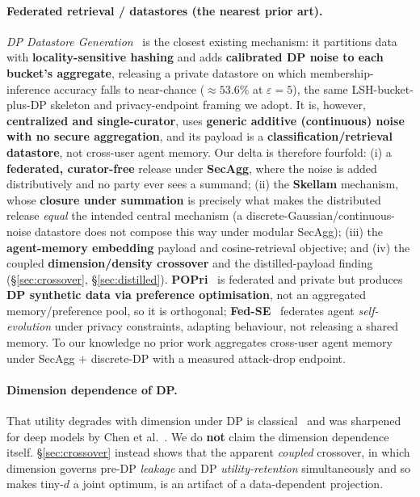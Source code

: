 \documentclass[pdflatex,sn-mathphys-num,12pt]{sn-jnl}
\theoremstyle{thmstyleone}%
\theoremstyle{thmstyletwo}%
\theoremstyle{thmstylethree}%
\newcommand{\eps}{\varepsilon}
\newcommand{\secref}[1]{\S\ref{#1}}
\begin{document}
\paragraph{Federated retrieval / datastores (the nearest prior art).}
\emph{DP Datastore Generation}~\cite{abouelenein2026dpdatastore} is the closest
existing mechanism: it partitions data with \textbf{locality-sensitive hashing}
and adds \textbf{calibrated DP noise to each bucket's aggregate}, releasing a
private datastore on which membership-inference accuracy falls to near-chance
($\approx 53.6\%$ at $\eps = 5$), the same LSH-bucket-plus-DP skeleton and
privacy-endpoint framing we adopt. It is, however, \textbf{centralized and
single-curator}, uses \textbf{generic additive (continuous) noise with no secure
aggregation}, and its payload is a \textbf{classification/retrieval datastore},
not cross-user agent memory. Our delta is therefore fourfold: (i) a
\textbf{federated, curator-free} release under \textbf{SecAgg}, where the noise is
added distributively and no party ever sees a summand; (ii) the \textbf{Skellam}
mechanism, whose \textbf{closure under summation} is precisely what makes the
distributed release \emph{equal} the intended central mechanism (a
discrete-Gaussian/continuous-noise datastore does not compose this way under
modular SecAgg); (iii) the \textbf{agent-memory embedding} payload and
cosine-retrieval objective; and (iv) the coupled \textbf{dimension/density
crossover} and the distilled-payload finding (\secref{sec:crossover},
\secref{sec:distilled}). \textbf{POPri}~\cite{hou2025popri} is federated and
private but produces \textbf{DP synthetic data via preference optimisation}, not
an aggregated memory/preference pool, so it is orthogonal;
\textbf{Fed-SE}~\cite{chen2025fedse} federates agent \emph{self-evolution} under
privacy constraints, adapting behaviour, not releasing a shared memory. To our
knowledge no prior work aggregates cross-user agent memory under SecAgg $+$
discrete-DP with a measured attack-drop endpoint.

\paragraph{Dimension dependence of DP.}
That utility degrades with dimension under DP is
classical~\cite{bassily2014erm} and was sharpened for deep models by Chen et
al.~\cite{chen2022price}. We do \textbf{not} claim the dimension dependence
itself. \secref{sec:crossover} instead shows that the apparent \emph{coupled}
crossover, in which dimension governs pre-DP \emph{leakage} and DP
\emph{utility-retention} simultaneously and so makes tiny-$d$ a joint optimum, is
an artifact of a data-dependent projection.
\end{document}
